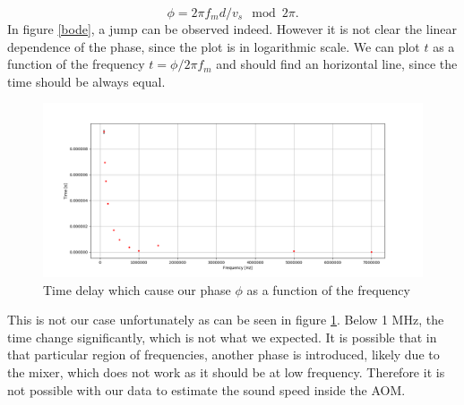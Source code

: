 \documentclass[a4paper,10pt]{article}
\begin{document}
 \[\phi = 2\pi f_m d/v_s \mod 2\pi.\]
In figure \ref{bode}, a jump can be observed indeed. However it is not clear the linear dependence of the phase, since the plot is in logarithmic scale. We can plot $t$ as a function of the frequency $t = \phi/2\pi f_m$ and should find an horizontal line, since the time should be always equal. 
\begin{figure}[H]
\centering
\includegraphics[width=\textwidth]{time}
\caption{Time delay which cause our phase $\phi$ as a function of the frequency}\label{cazzo}
\end{figure}
This is not our case unfortunately as can be seen in figure \ref{cazzo}. Below 1 MHz, the time change significantly, which is not what we expected. It is possible that in that particular region of frequencies, another phase is introduced, likely due to the mixer, which does not work as it should be at low frequency.  Therefore it is not possible with our data to estimate the sound speed inside the AOM.
\end{document}
